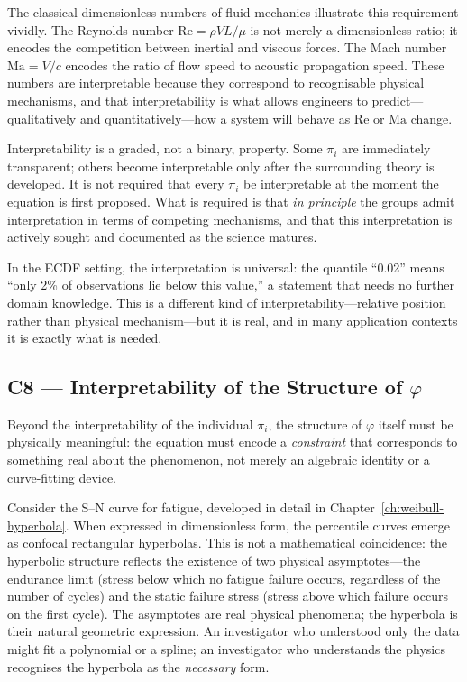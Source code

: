The classical dimensionless numbers of fluid mechanics illustrate
this requirement vividly.  The Reynolds number
$\mathrm{Re} = \rho V L/\mu$ is not merely a dimensionless ratio;
it encodes the competition between inertial and viscous forces.
The Mach number $\mathrm{Ma} = V/c$ encodes the ratio of flow
speed to acoustic propagation speed.  These numbers are
interpretable because they correspond to recognisable physical
mechanisms, and that interpretability is what allows engineers to
predict---qualitatively and quantitatively---how a system will
behave as $\mathrm{Re}$ or $\mathrm{Ma}$ change.

\begin{remarkbox}
Interpretability is a graded, not a binary, property.  Some
$\pi_i$ are immediately transparent; others become interpretable
only after the surrounding theory is developed.  It is not
required that every $\pi_i$ be interpretable at the moment the
equation is first proposed.  What is required is that
\emph{in principle} the groups admit interpretation in terms of
competing mechanisms, and that this interpretation is actively
sought and documented as the science matures.

In the ECDF setting, the interpretation is universal: the quantile
``0.02'' means ``only 2\% of observations lie below this value,''
a statement that needs no further domain knowledge.  This is a
different kind of interpretability---relative position rather than
physical mechanism---but it is real, and in many application
contexts it is exactly what is needed.
\end{remarkbox}

\subsection{C8 --- Interpretability of the Structure of $\varphi$}

\begin{condbox}
\begin{condition}
  \label{cond:ucq:interp_phi}
Beyond the interpretability of the individual $\pi_i$, the
structure of $\varphi$ itself must be physically meaningful: the
equation must encode a \emph{constraint} that corresponds to
something real about the phenomenon, not merely an algebraic
identity or a curve-fitting device.
\end{condition}
\end{condbox}

Consider the S--N curve for fatigue, developed in detail in
Chapter~\ref{ch:weibull-hyperbola}.  When expressed in dimensionless
form, the percentile curves emerge as confocal rectangular
hyperbolas.  This is not a mathematical coincidence: the hyperbolic
structure reflects the existence of two physical
asymptotes---the endurance limit (stress below which no fatigue
failure occurs, regardless of the number of cycles) and the static
failure stress (stress above which failure occurs on the first
cycle).  The asymptotes are real physical phenomena; the hyperbola
is their natural geometric expression.  An investigator who
understood only the data might fit a polynomial or a spline; an
investigator who understands the physics recognises the hyperbola
as the \emph{necessary} form.

